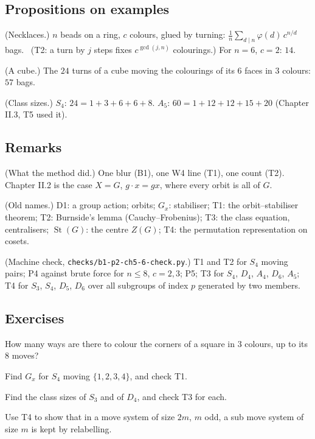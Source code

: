 \subsection*{Propositions on examples}

\begin{lines}
\item[\lab{P4}] (Necklaces.) $n$ beads on a ring, $c$ colours, glued by turning: $\frac{1}{n} \sum_{d \mid n} \varphi(d)\, c^{n/d}$ bags. \ (T2: a turn by $j$ steps fixes $c^{\gcd(j, n)}$ colourings.) For $n = 6$, $c = 2$: $14$.
\item[\lab{P5}] (A cube.) The $24$ turns of a cube moving the colourings of its $6$ faces in $3$ colours: $57$ bags.
\item[\lab{P6}] (Class sizes.) $S_4$: $24 = 1 + 3 + 6 + 6 + 8$. $A_5$: $60 = 1 + 12 + 12 + 15 + 20$ (Chapter II.3, T5 used it).
\end{lines}

\subsection*{Remarks}

\begin{lines}
\item[\lab{R1}] (What the method did.) One blur (B1), one W4 line (T1), one count (T2). Chapter II.2 is the case $X = G$, $g \cdot x = gx$, where every orbit is all of $G$.
\item[\lab{R2}] (Old names.) D1: a group action; orbits; $G_x$: stabiliser; T1: the orbit--stabiliser theorem; T2: Burnside's lemma (Cauchy--Frobenius); T3: the class equation, centralisers; $\operatorname{St}(G)$: the centre $Z(G)$; T4: the permutation representation on cosets.
\item[\lab{R3}] (Machine check, \texttt{checks/b1-p2-ch5-6-check.py}.) T1 and T2 for $S_4$ moving pairs; P4 against brute force for $n \le 8$, $c = 2, 3$; P5; T3 for $S_4$, $D_4$, $A_4$, $D_6$, $A_5$; T4 for $S_3$, $S_4$, $D_5$, $D_6$ over all subgroups of index $p$ generated by two members.
\end{lines}

\subsection*{Exercises}

\begin{lines}
\item[\lab{E1}] How many ways are there to colour the corners of a square in $3$ colours, up to its $8$ moves?
\item[\lab{E2}] Find $G_x$ for $S_4$ moving $\{1, 2, 3, 4\}$, and check T1.
\item[\lab{E3}] Find the class sizes of $S_3$ and of $D_4$, and check T3 for each.
\item[\lab{E4}] Use T4 to show that in a move system of size $2m$, $m$ odd, a sub move system of size $m$ is kept by relabelling.
\end{lines}

